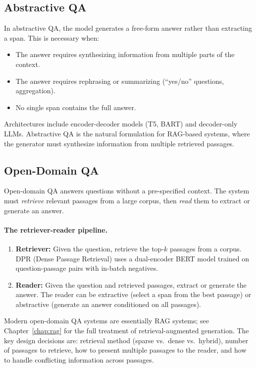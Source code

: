 \subsection{Abstractive QA}

In abstractive QA, the model generates a free-form answer rather than extracting a span.
This is necessary when:
\begin{itemize}
    \item The answer requires synthesizing information from multiple parts of the context.
    \item The answer requires rephrasing or summarizing (``yes/no'' questions, aggregation).
    \item No single span contains the full answer.
\end{itemize}

Architectures include encoder-decoder models (T5, BART) and decoder-only LLMs.  Abstractive
QA is the natural formulation for RAG-based systems, where the generator must synthesize
information from multiple retrieved passages.

\subsection{Open-Domain QA}
\label{sec:open_domain_qa}

Open-domain QA answers questions without a pre-specified context.  The system must
\emph{retrieve} relevant passages from a large corpus, then \emph{read} them to extract or
generate an answer.

\paragraph{The retriever-reader pipeline.}
\begin{enumerate}[label=\textbf{\arabic*.}]
    \item \textbf{Retriever:} Given the question, retrieve the top-$k$ passages from a corpus.
          DPR (Dense Passage Retrieval) uses a dual-encoder BERT model trained on
          question-passage pairs with in-batch negatives.
    \item \textbf{Reader:} Given the question and retrieved passages, extract or generate the
          answer.  The reader can be extractive (select a span from the best passage) or
          abstractive (generate an answer conditioned on all passages).
\end{enumerate}

Modern open-domain QA systems are essentially RAG systems; see
Chapter~\ref{chap:rag} for the full treatment of retrieval-augmented
generation.  The key design decisions are: retrieval method (sparse
vs.\ dense vs.\ hybrid), number of passages to retrieve, how to present multiple passages to
the reader, and how to handle conflicting information across passages.

